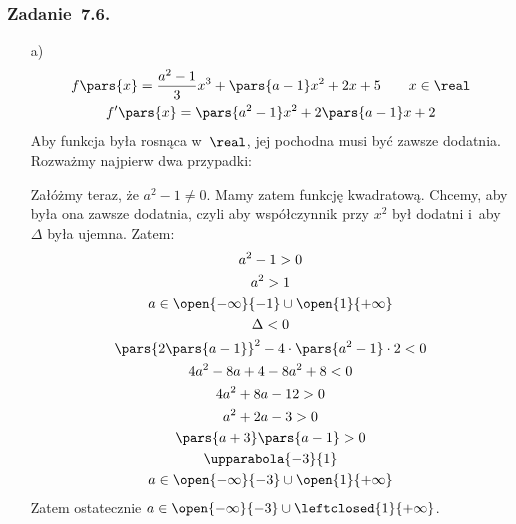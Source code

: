 \subsubsection*{Zadanie~7.6.}
\begin{itemize}
    \item[a)]
        \begin{gather*}
            f\pars{x} = \frac{a^2 - 1}{3}x^3 + \pars{a - 1}x^2 + 2x + 5 \qquad x \in \real\\
            f'\pars{x} = \pars{a^2 - 1}x^2 + 2\pars{a - 1}x + 2
        \end{gather*}
        Aby funkcja była rosnąca w~\(\real\), jej pochodna musi być zawsze dodatnia. Rozważmy najpierw dwa przypadki:
        Załóżmy teraz, że \(a^2 - 1 \neq 0\). Mamy zatem funkcję kwadratową. Chcemy, aby była ona zawsze dodatnia, czyli aby współczynnik przy \(x^2\) był dodatni i~aby \(\Delta\) była ujemna. Zatem:
        \begin{gather*}
            a^2 - 1 > 0\\
            a^2 > 1\\
            a \in \open{-\infty}{-1} \cup \open{1}{+\infty}\\
            \Delta < 0\\
            \pars{2\pars{a - 1}}^2 - 4 \cdot \pars{a^2 - 1} \cdot 2 < 0\\
            4a^2 - 8a + 4 - 8a^2 + 8 < 0\\
            4a^2 + 8a - 12 > 0\\
            a^2 + 2a - 3 > 0\\
            \pars{a + 3}\pars{a - 1} > 0\\
            \upparabola{-3}{1}\\
            a \in \open{-\infty}{-3} \cup \open{1}{+\infty}
        \end{gather*}
        Zatem ostatecznie \(a \in \open{-\infty}{-3} \cup \leftclosed{1}{+\infty}\).
\end{itemize}
